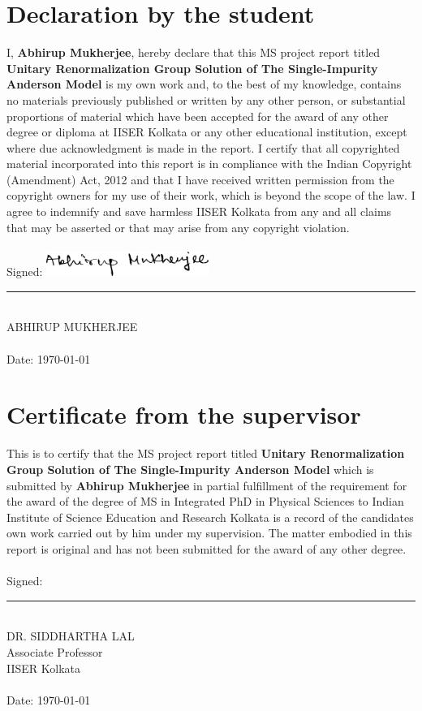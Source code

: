 \documentclass[twoside]{report}
\numberwithin{equation}{section}
\begin{document}
\chapter*{Declaration by the student}
I, {\large\textbf{Abhirup Mukherjee}}, hereby declare that this MS project report titled {\large\textbf{Unitary Renormalization Group Solution of The Single-Impurity Anderson Model}} is my own work and, to the best of my knowledge, contains no materials previously published or written by any other person, or substantial proportions of material which have been accepted for the award of any other degree or diploma at IISER Kolkata or any other educational institution, except where due acknowledgment is made in the report. I certify that all copyrighted material incorporated into this report is in compliance with the Indian Copyright (Amendment) Act, 2012 and that I have received written permission from the copyright owners for my use of their work, which is beyond the scope of the law. I agree to indemnify and save harmless IISER Kolkata from any and all claims that may be asserted or that may arise from any copyright violation.
\\\\
Signed:
\hspace{30pt}\includegraphics[width=150pt]{../figures/signature_black.png}
\\
\rule[1em]{0.5\linewidth}{0.5pt}\\  %
ABHIRUP MUKHERJEE
\\\\
Date:
\today

\chapter*{Certificate from the supervisor}
This is to certify that the MS project report titled {\large\textbf{Unitary Renormalization Group Solution of The Single-Impurity Anderson Model}} which is submitted by {\large\textbf{Abhirup Mukherjee}} in partial fulfillment of the requirement for the award of the degree of MS in Integrated PhD in Physical Sciences to Indian Institute of Science Education and Research Kolkata is a record of the candidates own work carried out by him under my supervision. The matter embodied in this report is original and has not been submitted for the award of any other degree.
\\\\
Signed:\\[10pt]
\rule[1em]{0.5\linewidth}{0.5pt}\\  %
DR. SIDDHARTHA LAL\\
Associate Professor\\
IISER Kolkata
\\\\
Date:
\today
\end{document}
